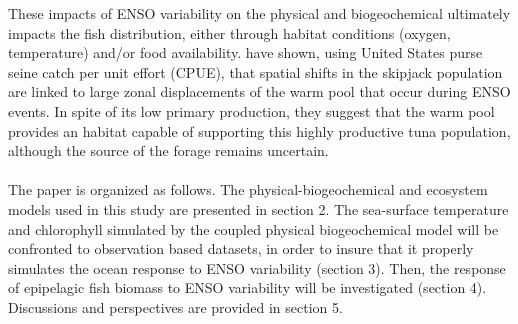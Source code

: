 These impacts of ENSO variability on the physical and biogeochemical ultimately impacts the fish distribution, either through habitat conditions (oxygen, temperature) and/or food availability. \cite{lehodeyNinoSouthernOscillation1997}  have shown, using United States purse seine catch per unit effort (CPUE), that spatial shifts in the skipjack population are linked to large zonal displacements of the warm pool that occur during ENSO  events. In spite of its low primary production, they suggest that the warm pool provides an habitat capable of supporting this highly productive tuna population, although the source of the forage remains uncertain.\\\\


The paper is organized as follows. The physical-biogeochemical and ecosystem models used in this study are presented in section 2. The sea-surface temperature and chlorophyll simulated by the coupled physical biogeochemical model will be confronted to observation based datasets, in order to insure that it properly simulates the ocean response to ENSO variability (section 3). Then, the response of epipelagic fish biomass to ENSO variability will be investigated (section 4). Discussions and perspectives are provided in section 5.\\
